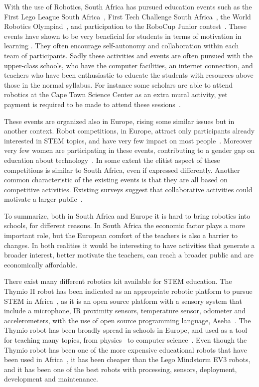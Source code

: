 \documentclass{intech-journal}
\begin{document}
With the use of Robotics, South Africa has pursued education events such as the First Lego League South Africa~\cite{FLLSA}, First Tech Challenge South Africa~\cite{FTCA}, the World Robotics Olympiad~\cite{WRO}, and participation to the RoboCup Junior contest~\cite{ferrein2011robocup}. 
These events have shown to be very beneficial for students in terms of motivation in learning \cite{deci1985intrinsic}. 
They often encourage self-autonomy and collaboration within each team of participants.
Sadly these activities and events are often pursued with the upper-class schools, who have the computer facilities, an internet connection, and teachers who have been enthusiastic to educate the students with resources above those in the normal syllabus. 
For instance some scholars are able to attend robotics at the Cape Town Science Center as an extra mural activity, yet payment is required to be made to attend these sessions~\cite{Capets}.

These events are organized also in Europe, rising some similar issues but in another context.
Robot competitions, in Europe, attract only participants already interested in STEM topics, and have very few impact on most people~\cite{riedo2013upgrade}.
Moreover very few women are participating in these events, contributing to a gender gap on education about technology~\cite{riedo2013upgrade}.
In some extent the elitist aspect of these competitions is similar to South Africa, even if expressed differently.
Another common characteristic of the existing events is that they are all based on competitive activities. 
Existing surveys suggest that collaborative activities could motivate a larger public~\cite{riedo2013upgrade}.

To summarize, both in South Africa and Europe it is hard to bring robotics into schools, for different reasons. 
In South Africa the economic factor plays a more important role, but the European comfort of the teachers is also a barrier to changes.
In both realities it would be interesting to have activities that generate a broader interest, better motivate the teachers, can reach a broader public and are economically affordable.


There exist many different robotics kit available for STEM education. 
The Thymio II robot has been indicated as an appropriate robotic platform to pursue STEM in Africa~\cite{Gyebi2015}, as it is an open source platform with a sensory system that include a microphone, IR proximity sensors, temperature sensor, odometer and accelerometers, with the use of open source programming language, Aseba~\cite{magnenat2010aseba}. 
The Thymio robot has been broadly spread in schools in Europe\cite{roy2015inirobot}, and used as a tool for teaching many topics, from physics~\cite{Mubin2013} to computer science~\cite{magnenat2014}. 
Even though the Thymio robot has been one of the more expensive educational robots that have been used in Africa~\cite{Gyebi2015}, it has been cheaper than the Lego Mindstorm EV3 robots, and it has been one of the best robots with processing, sensors, deployment, development and maintenance.
\end{document}
